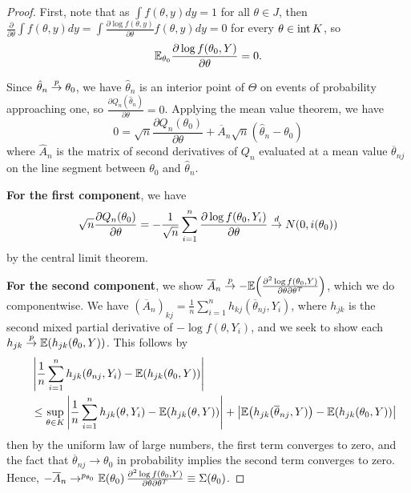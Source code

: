 \begin{proof}
  First, note that as $\int f(\theta, y) dy = 1$ for all $\theta \in
  J$, then $\frac{\partial}{\partial \theta} \int f(\theta, y) dy =
  \int \frac{\partial \log f(\theta, y)}{\partial \theta} f(\theta, y)
  dy= 0$
  for every $\theta \in \operatorname*{int} K$, so
  \begin{align}
    \label{eq:47}
    \E_{\theta_{0}} \frac{\partial \log f(\theta_{0}, Y)}{\partial
      \theta}  = 0.
  \end{align}

  Since $\hat \theta_{n} \overset{p}{\rightarrow} \theta_{0}$, we have $\hat \theta_{n}$ is
  an interior point of $\Theta$ on events of probability approaching
  one, so $\frac{\partial Q_{n}(\hat \theta_{n})}{\partial \theta} =
  0$.  Applying the mean value theorem, we have
  \begin{equation}
    \label{eq:48}
    0 = \sqrt{n} \frac{\partial Q_{n}(\theta_{0})}{\partial \theta}  +
    \overline A_{n} \sqrt{n}(\hat \theta_{n} - \theta_{0})
  \end{equation} where $\hat A_{n}$ is the matrix of second
  derivatives of $Q_{n}$ evaluated at a mean value $\overline
  \theta_{nj}$ on the line segment between $\theta_{0}$ and $\hat
  \theta_{n}$.

  \textbf{For the first component}, we have
  \begin{align}
    \label{eq:49}
    \sqrt{n} \frac{\partial Q_{n}(\theta_{0})}{\partial \theta} = -
    \frac{1}{\sqrt{n}} \sum_{i=1}^{n} \frac{\partial \log
      f(\theta_{0}, Y_{i})}{\partial \theta} \overset{d}{\rightarrow} N(0, i(\theta_{0}))
  \end{align} by the central limit theorem.

  \textbf{For the second component}, we show $\overline A_{n} \cp
  -\E{\frac{\partial^{2} \log f(\theta_{0}, Y)}{\partial
      \theta \partial \theta^{T}}}$, which we do componentwise. We
  have $(\overline A_{n})_{kj} = \frac{1}{n} \sum_{i=1}^{n}
  h_{kj}(\overline \theta_{nj}, Y_{i})$, where $h_{jk}$ is the second
  mixed partial derivative of $-\log f(\theta, Y_{i})$, and we seek to
  show each $h_{jk} \cp \E{h_{jk}(\theta_{0}, Y)}$. This follows by
  \begin{align}
    \label{eq:52}
    &\left| \frac{1}{n} \sum_{i=1}^{n} h_{jk}(\theta_{nj}, Y_{i}) -
      \E{h_{jk}(\theta_{0}, Y)} \right| \\
    \quad &\leq \sup_{\theta \in K}
    \left| \frac{1}{n} \sum_{i=1}^{n} h_{jk}(\theta, Y_{i}) -
      \E{h_{jk}(\theta, Y)}\right| + \left| \E{h_{jk}(\overline
        \theta_{nj}, Y)} - \E{h_{jk}(\theta_{0}, Y)} \right|
  \end{align} then by the uniform law of large numbers, the first term
  converges to zero, and the fact that $\overline \theta_{nj}
  \rightarrow \theta_{0}$ in probability implies the second term
  converges to zero.  Hence, $-\overline A_{n}
  \rightarrow^{p_{\theta_{0}}} \E{\theta_{0}} \frac{\partial^{2} \log
    f(\theta_{0}, Y)}{\partial \theta \partial \theta^{T}} \equiv
  \Sigma(\theta_{0})$.


\end{proof}
